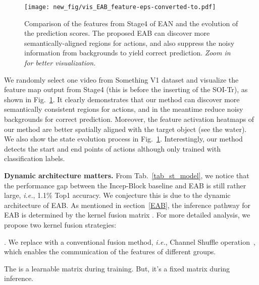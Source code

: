 \begin{figure}[!thbp]
	\centering
	\centerline{\texttt{[image: new\_fig/vis\_EAB\_feature-eps-converted-to.pdf]}}
	\caption {Comparison of the features from Stage4 of EAN and the evolution of the prediction scores. The proposed EAB can discover more semantically-aligned regions for actions, and also suppress the noisy information from backgrounds to yield correct prediction. \textit{Zoom in for better visualization.}
	}
\label{fig_vis_feature}
\end{figure}

We randomly select one video from Something V1 dataset and visualize the  feature map output from Stage4 (this is before the inserting of the SOI-Tr), as shown in Fig.~\ref{fig_vis_feature}. It clearly demonstrates that our method can discover more semantically consistent regions for actions, and in the meantime reduce noisy backgrounds for correct prediction. Moreover, the feature activation heatmaps of our method are better spatially aligned with the target object (see the water).
We also show the state evolution process in Fig.~\ref{fig_vis_feature}. Interestingly, our method detects the start and end points of actions although only trained with classification labels.





\textbf{Dynamic architecture matters.}
From Tab.~\ref{tab_st_model}, we notice that the performance gap between the Incep-Block baseline and EAB is still rather large, \textit{i.e.}, 1.1\% Top1 accuracy. We conjecture this is due to the dynamic architecture of EAB. As mentioned in section~\ref{EAB}, the inference pathway for EAB is determined by the kernel fusion matrix . For more detailed analysis, we propose two kernel fusion strategies:


. We replace  with a conventional fusion method, \textit{i.e.}, Channel Shuffle operation~\cite{zhang2018shufflenet}, which enables the communication of the features of different groups.

 The  is a learnable matrix during training. But, it's a fixed matrix during inference.






